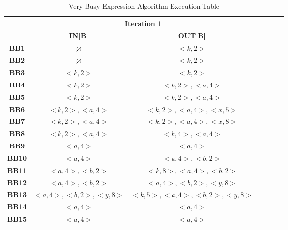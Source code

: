 \documentclass{article}
\begin{document}
\begin{table}[H]
\centering
\begin{tabular}{|c|c|c|c|c|c|c|}
\hline
   & \multicolumn{2}{c|}{\textbf{Iteration 1}}  \\ \hline
   & \textbf{IN[B]}   & \textbf{OUT[B]}  \\ \hline
    \textbf{BB1} & $\varnothing$ & $<k,2>$  \\ \hline
    \textbf{BB2} & $\varnothing$ & $<k,2>$  \\ \hline
    \textbf{BB3} & $<k,2>$ & $<k,2>$  \\ \hline
    \textbf{BB4} & $<k,2>$ & $<k,2>, <a, 4>$  \\ \hline
    \textbf{BB5} & $<k,2>$ & $<k,2>, <a, 4>$  \\ \hline
    \textbf{BB6} & $<k,2>, <a, 4>$ & $<k,2>, <a, 4>, <x, 5>$ \\ \hline
    \textbf{BB7} & $<k,2>, <a, 4>$ & $<k,2>, <a, 4>, <x, 8>$  \\ \hline
    \textbf{BB8} &  $<k,2>, <a, 4>$ & $<k,4>, <a, 4>$   \\ \hline
    \textbf{BB9} &  $<a, 4>$ & $<a, 4>$  \\ \hline
    \textbf{BB10} & $ <a, 4>$ & $<a, 4>, <b,2>$   \\ \hline
    \textbf{BB11} &  $ <a, 4>, <b,2>$ & $<k,8>, <a, 4>, <b,2>$  \\ \hline
    \textbf{BB12} & $<a, 4>, <b,2>$ & $<a, 4>, <b,2>, <y,8>$ \\ \hline
    \textbf{BB13} &  $<a, 4>, <b,2>, <y,8>$   &  $<k,5>, <a, 4>, <b,2>, <y,8>$  \\ \hline
    \textbf{BB14} &  $ <a, 4>$ & $<a, 4>$  \\ \hline
    \textbf{BB15} &  $ <a, 4>$ & $<a, 4>$  \\ \hline
\end{tabular}
\caption{Very Busy Expression Algorithm Execution Table}
\end{table}
\end{document}
